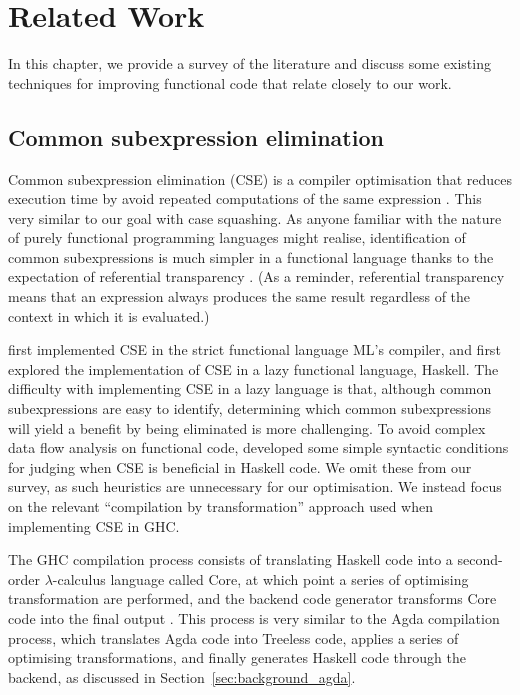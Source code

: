 \chapter{Related Work}
\label{cha:related_work}

In this chapter, we provide a survey of the literature and discuss some existing techniques for improving functional code that relate closely to our work.

\section{Common subexpression elimination}

Common subexpression elimination (CSE) is a compiler optimisation that reduces execution time by avoid repeated computations of the same expression \citep{Chitil-1998}. This very similar to our goal with case squashing. As anyone familiar with the nature of purely functional programming languages might realise, identification of common subexpressions is much simpler in a functional language thanks to the expectation of referential transparency \citep{Chitil-1998}. (As a reminder, referential transparency means that an expression always produces the same result regardless of the context in which it is evaluated.)

\citet{appel1992} first implemented CSE in the strict functional language ML's compiler, and \citet{Chitil-1998} first explored the implementation of CSE in a lazy functional language, Haskell. The difficulty with implementing CSE in a lazy language is that, although common subexpressions are easy to identify, determining which common subexpressions will yield a benefit by being eliminated is more challenging. To avoid complex data flow analysis on functional code, \citet{Chitil-1998} developed some simple syntactic conditions for judging when CSE is beneficial in Haskell code. We omit these from our survey, as such heuristics are unnecessary for our optimisation. We instead focus on the relevant ``compilation by transformation'' approach used when implementing CSE in GHC.

The GHC compilation process consists of translating Haskell code into a second-order $\lambda$-calculus language called Core, at which point a series of optimising transformation are performed, and the backend code generator transforms Core code into the final output \citep{Chitil-1998}. This process is very similar to the Agda compilation process, which translates Agda code into Treeless code, applies a series of optimising transformations, and finally generates Haskell code through the backend, as discussed in Section~\ref{sec:background_agda}.

